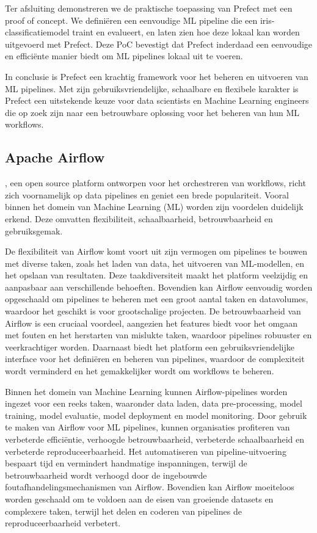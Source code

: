 Ter afsluiting demonstreren we de praktische toepassing van Prefect met een proof of concept. We definiëren een eenvoudige ML pipeline die een iris-classificatiemodel traint en evalueert, en laten zien hoe deze lokaal kan worden uitgevoerd met Prefect. Deze PoC bevestigt dat Prefect inderdaad een eenvoudige en efficiënte manier biedt om ML pipelines lokaal uit te voeren.

In conclusie is Prefect een krachtig framework voor het beheren en uitvoeren van ML pipelines. Met zijn gebruiksvriendelijke, schaalbare en flexibele karakter is Prefect een uitstekende keuze voor data scientists en Machine Learning engineers die op zoek zijn naar een betrouwbare oplossing voor het beheren van hun ML workflows.
\subsection{Apache Airflow}

\textcite{ApacheAirflow2024}, een open source platform ontworpen voor het orchestreren van workflows, richt zich voornamelijk op data pipelines en geniet een brede populariteit. Vooral binnen het domein van Machine Learning (ML) worden zijn voordelen duidelijk erkend. Deze omvatten flexibiliteit, schaalbaarheid, betrouwbaarheid en gebruiksgemak.

De flexibiliteit van Airflow komt voort uit zijn vermogen om pipelines te bouwen met diverse taken, zoals het laden van data, het uitvoeren van ML-modellen, en het opslaan van resultaten. Deze taakdiversiteit maakt het platform veelzijdig en aanpasbaar aan verschillende behoeften. Bovendien kan Airflow eenvoudig worden opgeschaald om pipelines te beheren met een groot aantal taken en datavolumes, waardoor het geschikt is voor grootschalige projecten. De betrouwbaarheid van Airflow is een cruciaal voordeel, aangezien het features biedt voor het omgaan met fouten en het herstarten van mislukte taken, waardoor pipelines robuuster en veerkrachtiger worden. Daarnaast biedt het platform een gebruiksvriendelijke interface voor het definiëren en beheren van pipelines, waardoor de complexiteit wordt verminderd en het gemakkelijker wordt om workflows te beheren.

Binnen het domein van Machine Learning kunnen Airflow-pipelines worden ingezet voor een reeks taken, waaronder data laden, data pre-processing, model training, model evaluatie, model deployment en model monitoring. Door gebruik te maken van Airflow voor ML pipelines, kunnen organisaties profiteren van verbeterde efficiëntie, verhoogde betrouwbaarheid, verbeterde schaalbaarheid en verbeterde reproduceerbaarheid. Het automatiseren van pipeline-uitvoering bespaart tijd en vermindert handmatige inspanningen, terwijl de betrouwbaarheid wordt verhoogd door de ingebouwde foutafhandelingsmechanismen van Airflow. Bovendien kan Airflow moeiteloos worden geschaald om te voldoen aan de eisen van groeiende datasets en complexere taken, terwijl het delen en coderen van pipelines de reproduceerbaarheid verbetert.

